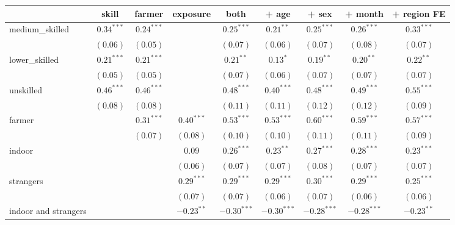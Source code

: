 
\begin{table}
\begin{center}
\begin{tabular}{l c c c c c c c c}
\hline
 & skill & farmer & exposure & both & + age & + sex & + month & + region FE \\
\hline
medium\_skilled      & $0.34^{***}$ & $0.24^{***}$ &              & $0.25^{***}$  & $0.21^{**}$   & $0.25^{***}$  & $0.26^{***}$  & $0.33^{***}$  \\
                     & $(0.06)$     & $(0.05)$     &              & $(0.07)$      & $(0.06)$      & $(0.07)$      & $(0.08)$      & $(0.07)$      \\
lower\_skilled       & $0.21^{***}$ & $0.21^{***}$ &              & $0.21^{**}$   & $0.13^{*}$    & $0.19^{**}$   & $0.20^{**}$   & $0.22^{**}$   \\
                     & $(0.05)$     & $(0.05)$     &              & $(0.07)$      & $(0.06)$      & $(0.07)$      & $(0.07)$      & $(0.07)$      \\
unskilled            & $0.46^{***}$ & $0.46^{***}$ &              & $0.48^{***}$  & $0.40^{***}$  & $0.48^{***}$  & $0.49^{***}$  & $0.55^{***}$  \\
                     & $(0.08)$     & $(0.08)$     &              & $(0.11)$      & $(0.11)$      & $(0.12)$      & $(0.12)$      & $(0.09)$      \\
farmer               &              & $0.31^{***}$ & $0.40^{***}$ & $0.53^{***}$  & $0.53^{***}$  & $0.60^{***}$  & $0.59^{***}$  & $0.57^{***}$  \\
                     &              & $(0.07)$     & $(0.08)$     & $(0.10)$      & $(0.10)$      & $(0.11)$      & $(0.11)$      & $(0.09)$      \\
indoor               &              &              & $0.09$       & $0.26^{***}$  & $0.23^{**}$   & $0.27^{***}$  & $0.28^{***}$  & $0.23^{***}$  \\
                     &              &              & $(0.06)$     & $(0.07)$      & $(0.07)$      & $(0.08)$      & $(0.07)$      & $(0.07)$      \\
strangers            &              &              & $0.29^{***}$ & $0.29^{***}$  & $0.29^{***}$  & $0.30^{***}$  & $0.29^{***}$  & $0.25^{***}$  \\
                     &              &              & $(0.07)$     & $(0.07)$      & $(0.06)$      & $(0.07)$      & $(0.06)$      & $(0.06)$      \\
indoor and strangers &              &              & $-0.23^{**}$ & $-0.30^{***}$ & $-0.30^{***}$ & $-0.28^{***}$ & $-0.28^{***}$ & $-0.23^{**}$  \\

\end{tabular}
\end{center}
\end{table}
